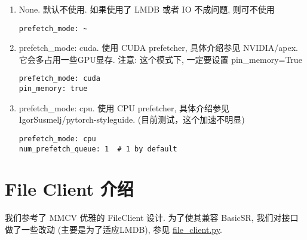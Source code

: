 \documentclass[../main.tex]{subfiles}
\begin{document}
\begin{enumerate}
\item None. 默认不使用. 如果使用了 LMDB 或者 IO 不成问题, 则可不使用
\begin{verbatim}
prefetch_mode: ~
\end{verbatim}

\item prefetch\_mode: cuda. 使用 CUDA prefetcher, 具体介绍参见 NVIDIA/apex. 它会多占用一些GPU显存. 注意: 这个模式下, 一定要设置 pin\_memory=True
\begin{verbatim}
prefetch_mode: cuda
pin_memory: true
\end{verbatim}

\item prefetch\_mode: cpu. 使用 CPU prefetcher, 具体介绍参见 IgorSusmelj/pytorch-styleguide. (目前测试，这个加速不明显)
\begin{verbatim}
prefetch_mode: cpu
num_prefetch_queue: 1  # 1 by default
\end{verbatim}

\end{enumerate}



\section{File Client 介绍}\label{data_preparation:file_client}

我们参考了 MMCV 优雅的 FileClient 设计. 为了使其兼容 BasicSR, 我们对接口做了一些改动 (主要是为了适应LMDB), 参见 \href{https://github.com/XPixelGroup/BasicSR/blob/master/basicsr/utils/file_client.py}{file\_client.py}.
\end{document}

